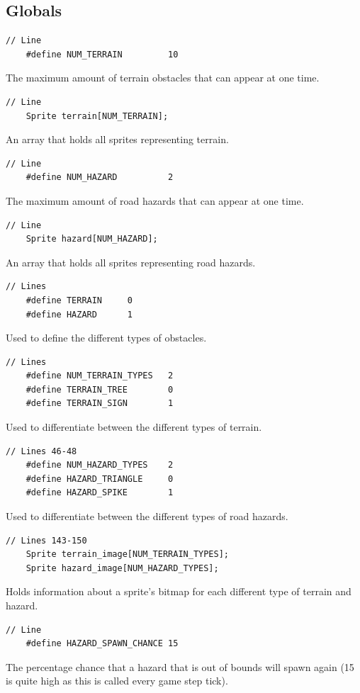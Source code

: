 \documentclass{article}
\begin{document}
\subsection*{Globals}
\begin{lstlisting}[style=CStyle]
	// Line 
	#define NUM_TERRAIN         10
\end{lstlisting}
The maximum amount of terrain obstacles that can appear at one time.
\begin{lstlisting}[style=CStyle]
	// Line 
	Sprite terrain[NUM_TERRAIN]; 
\end{lstlisting}
An array that holds all sprites representing terrain.
\begin{lstlisting}[style=CStyle]
	// Line 
	#define NUM_HAZARD          2
\end{lstlisting}
The maximum amount of road hazards that can appear at one time. 
\begin{lstlisting}[style=CStyle]
	// Line 
	Sprite hazard[NUM_HAZARD];
\end{lstlisting}
An array that holds all sprites representing road hazards.
\begin{lstlisting}[style=CStyle]
	// Lines 
	#define TERRAIN     0
	#define HAZARD      1
\end{lstlisting}
Used to define the different types of obstacles.
\begin{lstlisting}[style=CStyle]
	// Lines 
	#define NUM_TERRAIN_TYPES   2
	#define TERRAIN_TREE        0
	#define TERRAIN_SIGN        1
\end{lstlisting}
Used to differentiate between the different types of terrain.
\begin{lstlisting}[style=CStyle]
	// Lines 46-48
	#define NUM_HAZARD_TYPES    2
	#define HAZARD_TRIANGLE     0
	#define HAZARD_SPIKE        1
\end{lstlisting}
Used to differentiate between the different types of road hazards.
\begin{lstlisting}[style=CStyle]
	// Lines 143-150
	Sprite terrain_image[NUM_TERRAIN_TYPES];
	Sprite hazard_image[NUM_HAZARD_TYPES];
\end{lstlisting}
Holds information about a sprite's bitmap for each different type of terrain and hazard.
\newpage
\begin{lstlisting}[style=CStyle]
	// Line
	#define HAZARD_SPAWN_CHANCE 15
\end{lstlisting}
The percentage chance that a hazard that is out of bounds will spawn again (15 is quite high as this is called every game step tick).
\end{document}
